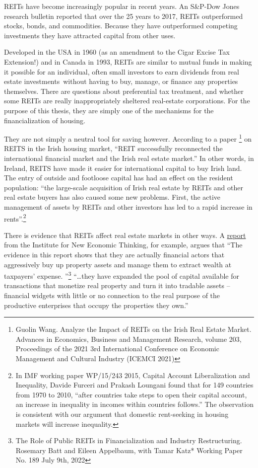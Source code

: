 REITs have become increasingly popular in recent years.  An S\&P-Dow Jones research bulletin reported that over the  25 years to 2017, REITs outperformed stocks, bonds, and commodities. Because they have outperformed competing investments they have attracted  capital from other uses.

Developed in the USA  in 1960 (as an amendment to the Cigar Excise Tax Extension!) and in Canada in 1993, REITs are similar to mutual funds in making it possible for an individual, often small investors to earn dividends from real estate investments without having to buy, manage, or finance any properties themselves. There are questions about preferential tax treatment, and whether some REITs are really inappropriately sheltered real-estate corporations.  For the purpose of this thesis, they are simply one of the mechanisms for the financialization of housing.

They are not simply a neutral tool for saving however. According to a paper \cite{wangAnalyzeImpactREITs2021}\footnote{Guolin Wang. Analyze the Impact of REITs on the Irish Real Estate Market. Advances in Economics, Business and Management Research, volume 203, Proceedings of the 2021 3rd International Conference on Economic Management and Cultural Industry (ICEMCI 2021)} on REITS in the Irish housing market, ``REIT successfully reconnected the international financial market and the Irish real estate market.'' In other words, in Ireland, REITS have made it easier for international capital to buy Irish land. The entry of outside and footloose capital has had an effect on the resident population:  ``the large-scale acquisition of Irish real estate by REITs and other real estate buyers has also caused some new problems. First, the active management of assets by REITs and other investors has led to a rapid increase in rents''.\footnote{In IMF working paper WP/15/243 2015, Capital Account Liberalization and Inequality, Davide Furceri and Prakash Loungani found that for 149 countries from 1970 to 2010, ``after countries take steps to open their capital account, an increase in inequality in incomes within countries follows.'' The observation is consistent with our argument  that domestic rent-seeking in housing markets will increase inequality.}   \cite{furceriCapitalAccountLiberalization2015}

There is evidence that REITs affect real estate markets in other ways. A \href{https://www.ineteconomics.org/research/research-papers/the-role-of-public-reits-in-financialization-and-industry-restructuring}{report} from the Institute for New Economic Thinking, for example, argues that ``The evidence in this report shows that they are actually financial actors that aggressively buy up property assets and manage them to extract wealth at taxpayers’ expense. ''\footnote{The Role of Public REITs in Financialization and Industry Restructuring. Rosemary Batt and Eileen Appelbaum, with Tamar Katz* Working Paper No. 189 July 9th, 2022} ``\dots they have expanded the pool of capital available for transactions that monetize real property and turn it into tradable assets – financial widgets with little or no connection to the real purpose of the productive enterprises that occupy the properties they own.''

